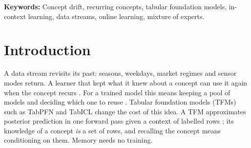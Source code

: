 \documentclass[11pt]{article}
\theoremstyle{plain}
\theoremstyle{definition}
\theoremstyle{remark}
\newcommand{\method}{\textsc{MICE}}   %
\begin{document}
\begin{abstract}
of the registered 90\%, so these gains are measured with contexts that are mixed, not with the pure contexts the
recall theorem assumes. On 29 real streams \method{} is more accurate than all
four in-context baselines on 23, and its one-sided 95\% block-bootstrap bound on the difference to the plain window is
above $-0.3$ points on 28 (backbone seed 0, fixed segments; detected segments differ by 0.01 points on average). With
fixed segments, against an unmerged archive and a snapshot pool whose size was chosen,
by timing alone, to fit the time per batch of \method{} on three real prefixes, \method{} is more accurate on the aligned grid (by 6.7 and 7.5 points) and on
average over nine real streams (by 0.35 and 0.27), and level with the snapshot pool on the shifted grid, as are both
pools with four experts, which take more time per batch than \method{}. With detected segments, \method{} takes 1.07\,s
per batch on the three prefixes, against 2.58\,s for an archive of twelve experts with the same segments; it is 5.7
to 6.6 points more accurate than a snapshot pool of two experts on fresh, shifted and misaligned grid streams, and
1.3 to 3.4 points more accurate than one of twelve, which takes 1.3 to 2.6 times as long, except on 2\,000-row
blocks, where the two are level.
\end{abstract}
\noindent\textbf{Keywords:} Concept drift, recurring concepts, tabular foundation models, in-context learning, data streams, online learning, mixture of experts.





\section{Introduction}
\label{sec:intro}

A data stream revisits its past: seasons, weekdays, market regimes and sensor modes return. A learner that kept what
it knew about a concept can use it again when the concept recurs \citep{gama2014survey,lu2019learning}. For a
trained model this means keeping a pool of models and deciding which one to reuse
\citep{goncalves2013rcd,gama2014recurrent,zhao2025mooe}. Tabular foundation models (TFMs) such as TabPFN
\citep{hollmann2025tabpfn} and TabICL \citep{qu2025tabicl} change the cost of this idea. A TFM approximates posterior
prediction in one forward pass given a context of labelled rows \citep{muller2022pfn,nagler2023statistical}; its
knowledge of a concept \emph{is} a set of rows, and recalling the concept means conditioning on them. Memory needs no
training.
\end{document}
